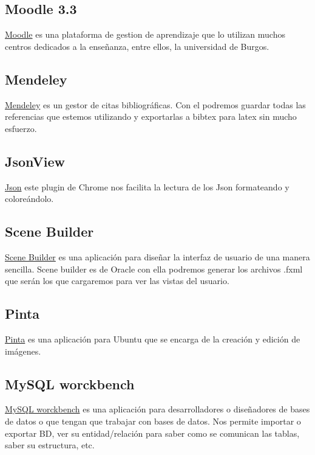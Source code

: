 \subsection{Moodle 3.3}\label{moodle}

\href{https://moodle.org/?lang=es}{Moodle} es una plataforma de gestion de aprendizaje que lo utilizan muchos centros dedicados a la enseñanza, entre ellos, la universidad de Burgos. 

\subsection{Mendeley}\label{mendeley}

\href{https://www.mendeley.com/}{Mendeley} es un gestor de citas bibliográficas. Con el podremos guardar todas las referencias que estemos utilizando y exportarlas a bibtex para latex sin mucho esfuerzo.

\subsection{JsonView}\label{jsonview}

\href{https://chrome.google.com/webstore/detail/jsonview/chklaanhfefbnpoihckbnefhakgolnmc}{Json} este plugin de Chrome nos facilita la lectura de los Json formateando y coloreándolo.

\subsection{Scene Builder}\label{scene-builder}

\href{http://www.oracle.com/technetwork/java/javase/downloads/javafxscenebuilder-info-2157684.html}{Scene Builder} es una aplicación para diseñar la interfaz de usuario de una manera sencilla. Scene builder es de Oracle con ella podremos generar los archivos .fxml que serán los que cargaremos para ver las vistas del usuario.

\subsection{Pinta}\label{pinta}

\href{https://pinta-project.com/pintaproject/pinta/}{Pinta} es una aplicación para Ubuntu que se encarga de la creación y edición de imágenes.

\subsection{MySQL worckbench}\label{pinta}

\href{https://pinta-project.com/pintaproject/pinta/}{MySQL worckbench} es una aplicación para desarrolladores o diseñadores de bases de datos o que tengan que trabajar con bases de datos. Nos permite importar o exportar BD, ver su entidad/relación para saber como se comunican las tablas, saber su estructura, etc. \cite{web:worckbench}
